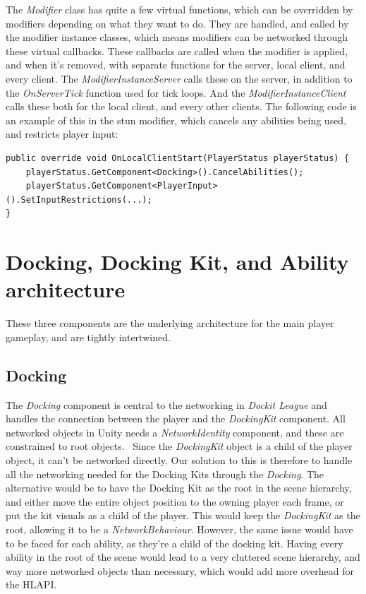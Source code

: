 The \emph{Modifier} class has quite a few virtual functions, which can be overridden by modifiers depending on what they want to do. They are handled, and called by the modifier instance classes, which means modifiers can be networked through these virtual callbacks. These callbacks are called when the modifier is applied, and when it's removed, with separate functions for the server, local client, and every client. The \emph{ModifierInstanceServer} calls these on the server, in addition to the \emph{OnServerTick} function used for tick loops. And the \emph{ModifierInstanceClient} calls these both for the local client, and every other clients. The following code is an example of this in the stun modifier, which cancels any abilities being used, and restricts player input:
\begin{verbatim}
public override void OnLocalClientStart(PlayerStatus playerStatus) {
    playerStatus.GetComponent<Docking>().CancelAbilities();
    playerStatus.GetComponent<PlayerInput>().SetInputRestrictions(...);
}
\end{verbatim}

\section{Docking, Docking Kit, and Ability architecture}
These three components are the underlying architecture for the main player gameplay, and are tightly intertwined.

\subsection{Docking}
The \emph{Docking} component is central to the networking in \emph{Dockit League} and handles the connection between the player and the \emph{DockingKit} component. All networked objects in Unity needs a \emph{NetworkIdentity} component, and these are constrained to root objects.~\cite{unityUNETSpawning} Since the \emph{DockingKit} object is a child of the player object, it can't be networked directly. Our solution to this is therefore to handle all the networking needed for the Docking Kits through the \emph{Docking}. The alternative would be to have the Docking Kit as the root in the scene hierarchy, and either move the entire object position to the owning player each frame, or put the kit visuals as a child of the player. This would keep the \emph{DockingKit} as the root, allowing it to be a \emph{NetworkBehaviour}. However, the same issue would have to be faced for each ability, as they're a child of the docking kit. Having every ability in the root of the scene would lead to a very cluttered scene hierarchy, and way more networked objects than necessary, which would add more overhead for the HLAPI. 

